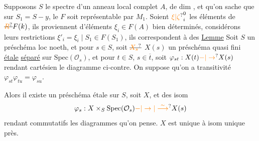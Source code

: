 
Supposons $S$ le spectre d'un anneau local complet
$A$,   de dim , et qu'on sache
que sur $S_1=S-y$, le  $F$ soit représentable
par $M_1$.  Soient
$\unsure{\xi|\zeta}_i^0$   les éléments de $\deleted{\unsure{R}}F(k)$, ils proviennent d'éléments
$\xi_i\in F(A)$ bien déterminés, considérons leurs
restrictions $\xi'_i=\xi_i\mid S_1\in F(S_1)$, ils correspondent à des
 \uline{Lemme} Soit $S$ un préschéma loc noeth, et
pour  $s\in S$, soit $\deleted{\unsure{X_s}}$ $X(s)$ un préschéma
quasi fini \uline{étale} \uline{séparé} sur $\mathrm{Spec}(\mathcal O_s)$, et pour
$t\in S$, $s\in\overline t$, soit $\varphi_{st}:X(t)\unsure{-|\to}X(s)$ rendant
cartésien le diagramme ci-contre. On suppose qu'on a transitivité
$\varphi_{st}\varphi_{tu}=\varphi_{su}$.

 Alors il existe un préschéma
étale  sur $S$, soit $X$, et des isom
\[
\varphi_s:X\times_S\mathrm{Spec}(\mathcal O_s)\unsure{-|\to|\overset{\sim}{\longrightarrow}}X(s)
\]
rendant commutatifs les diagrammes qu'on pense.
$X$ est unique à isom unique près.

